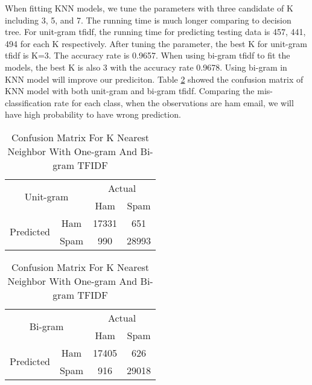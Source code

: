 When fitting KNN models, we tune the parameters with three candidate of K including 3, 5, and 7. The running time is much longer comparing to decision tree. For unit-gram tfidf, the running time for predicting testing data is 457, 441, 494 for each K respectively. After tuning the parameter, the best K for unit-gram tfidf is K=3. The accuracy rate is 0.9657. When using bi-gram tfidf to fit the models, the best K is also 3 with the accuracy rate 0.9678. Using bi-gram in KNN model will improve our prediciton. Table \ref{Confusion_KNN} showed the confusion matrix of KNN model with both unit-gram and bi-gram tfidf. Comparing the mis-classification rate for each class, when the observations are ham email, we will have high probability to have wrong prediction.\\

\begin{table}[H]
\centering
\begin{subtable}{.5\textwidth}
\centering
\begin{tabular}{@{}|c|c|c|c|@{}}
\toprule
\multicolumn{2}{|c|}{\multirow{2}{*}{Unit-gram}} & \multicolumn{2}{c|}{Actual} \\ \cmidrule(l){3-4} 
\multicolumn{2}{|c|}{}                        & Ham          & Spam         \\ \midrule
\multirow{2}{*}{Predicted}       & Ham        & 17331        & 651          \\ \cmidrule(l){2-4} 
                                 & Spam       & 990          & 28993        \\ \bottomrule
\end{tabular}
\begin{tabular}{@{}|c|c|c|c|@{}}
\toprule
\multicolumn{2}{|c|}{\multirow{2}{*}{Bi-gram}} & \multicolumn{2}{c|}{Actual} \\ \cmidrule(l){3-4} 
\multicolumn{2}{|c|}{}                        & Ham          & Spam         \\ \midrule
\multirow{2}{*}{Predicted}       & Ham        & 17405        & 626          \\ \cmidrule(l){2-4} 
                                 & Spam       & 916          & 29018        \\ \bottomrule
\end{tabular}
\end{subtable}
\caption{Confusion Matrix For K Nearest Neighbor With One-gram And Bi-gram TFIDF}
\label{Confusion_KNN}
\end{table}